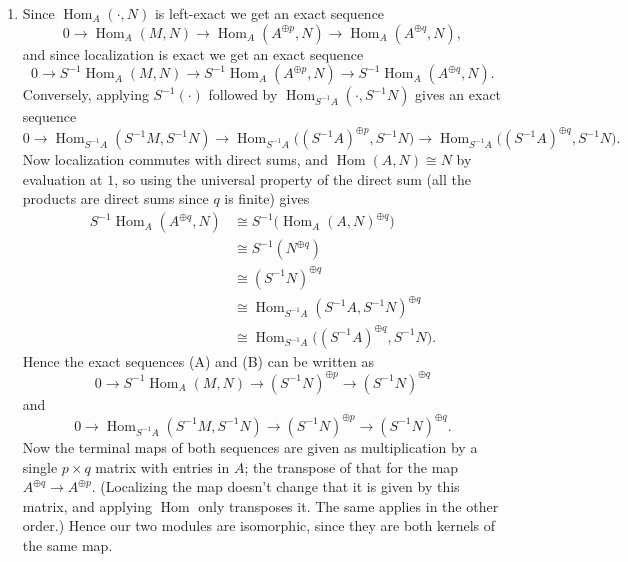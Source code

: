 \documentclass{report}
\DeclareMathOperator{\Hom}{Hom}
\begin{document}
\begin{enumerate}[label=\textbf{1.6.\Alph*.}]
	\item Since $\Hom_A(\cdot,N)$ is left-exact we get an exact sequence
	      \begin{equation*}
		      0 \to \Hom_A(M,N)
		      \to \Hom_A(A^{\oplus p},N)
		      \to \Hom_A(A^{\oplus q},N),
	      \end{equation*}
	      and since localization is exact we get an exact sequence
	      \begin{equation*}
		      0 \to S^{-1}\Hom_A(M,N)
		      \to S^{-1}\Hom_A(A^{\oplus p},N)
		      \to S^{-1}\Hom_A(A^{\oplus q},N).
		      \tag{A}
	      \end{equation*}
	      Conversely, applying $S^{-1}(\cdot)$ followed by
	      $\Hom_{S^{-1}A}(\cdot,S^{-1}N)$ gives an exact sequence
	      \begin{equation*}
		      0 \to \Hom_{S^{-1}A}(S^{-1}M,S^{-1}N)
		      \to \Hom_{S^{-1}A}\bigl((S^{-1}A)^{\oplus p},S^{-1}N\bigr)
		      \to \Hom_{S^{-1}A}\bigl((S^{-1}A)^{\oplus q},S^{-1}N\bigr).
		      \tag{B}
	      \end{equation*}
	      Now localization commutes with direct sums, and $\Hom(A,N)\cong N$ by
	      evaluation at $1$, so using the universal property of the direct sum
	      (all the products are direct sums since $q$ is finite) gives
	      \begin{align*}
		      S^{-1}\Hom_A(A^{\oplus q},N)
		       & \cong S^{-1}\bigl(\Hom_A(A,N)^{\oplus q}\bigr)                \\
		       & \cong S^{-1}(N^{\oplus q})                                    \\
		       & \cong (S^{-1}N)^{\oplus q}                                    \\
		       & \cong \Hom_{S^{-1}A}(S^{-1}A,S^{-1}N)^{\oplus q}              \\
		       & \cong \Hom_{S^{-1}A}\bigl((S^{-1}A)^{\oplus q},S^{-1}N\bigr).
	      \end{align*}
	      Hence the exact sequences (A) and (B) can be written as
	      \begin{equation*}
		      0 \to S^{-1}\Hom_A(M,N)
		      \to (S^{-1}N)^{\oplus p}
		      \to (S^{-1}N)^{\oplus q}
	      \end{equation*}
	      and
	      \begin{equation*}
		      0 \to \Hom_{S^{-1}A}(S^{-1}M,S^{-1}N)
		      \to (S^{-1}N)^{\oplus p}
		      \to (S^{-1}N)^{\oplus q}.
	      \end{equation*}
	      Now the terminal maps of both sequences are given as multiplication by
	      a single $p\times q$ matrix with entries in $A$; the transpose of that
	      for the map $A^{\oplus q}\to A^{\oplus p}$. (Localizing the map doesn't
	      change that it is given by this matrix, and applying $\Hom$ only
	      transposes it. The same applies in the other order.) Hence our two
	      modules are isomorphic, since they are both kernels of the same map.


\end{enumerate}
\end{document}
